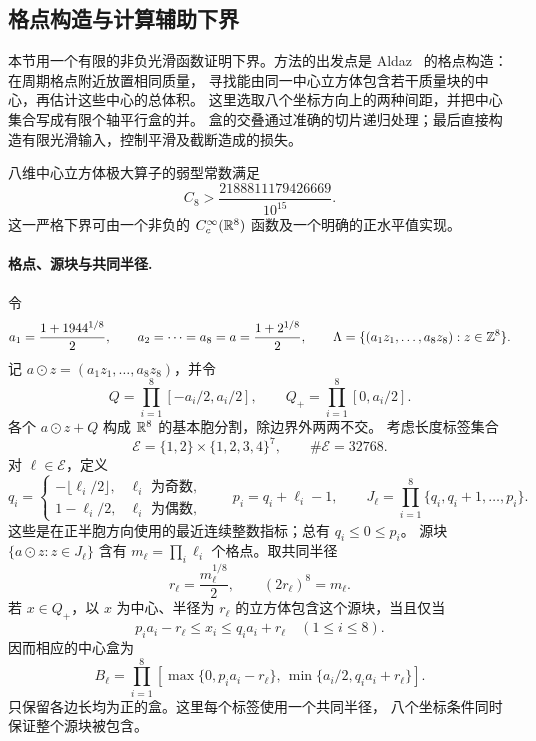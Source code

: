 \subsection{格点构造与计算辅助下界}
\label{lo:section}

本节用一个有限的非负光滑函数证明下界。方法的出发点是
Aldaz~\cite{Aldaz2000} 的格点构造：在周期格点附近放置相同质量，
寻找能由同一中心立方体包含若干质量块的中心，再估计这些中心的总体积。
这里选取八个坐标方向上的两种间距，并把中心集合写成有限个轴平行盒的并。
盒的交叠通过准确的切片递归处理；最后直接构造有限光滑输入，控制平滑及截断造成的损失。

\begin{proposition}\label{lo:bound}
八维中心立方体极大算子的弱型常数满足
\[
 C_8>\frac{2188811179426669}{10^{15}}.
\]
这一严格下界可由一个非负的 $C_c^\infty(\mathbb{R}^8)$ 函数及一个明确的正水平值实现。
\end{proposition}

\paragraph{格点、源块与共同半径.}
令
\begin{equation}\label{lo:spacing}
 a_1=\frac{1+1944^{1/8}}2,\qquad
 a_2=\cdots=a_8=a=\frac{1+2^{1/8}}2,
 \qquad
 \Lambda=\{(a_1z_1,\ldots,a_8z_8):z\in\mathbb{Z}^8\}.
\end{equation}
记 $a\odot z=(a_1z_1,\ldots,a_8z_8)$，并令
\[
 Q=\prod_{i=1}^8[-a_i/2,a_i/2],\qquad
 Q_+=\prod_{i=1}^8[0,a_i/2].
\]
各个 $a\odot z+Q$ 构成 $\mathbb{R}^8$ 的基本胞分割，除边界外两两不交。
考虑长度标签集合
\[
 \mathcal E=\{1,2\}\times\{1,2,3,4\}^7,
 \qquad \#\mathcal E=32768.
\]
对 $\ell\in\mathcal E$，定义
\begin{equation}\label{lo:source-indices}
 q_i=\begin{cases}
       -\lfloor\ell_i/2\rfloor,&\ell_i\text{ 为奇数},\\
       1-\ell_i/2,&\ell_i\text{ 为偶数},
      \end{cases}
 \qquad p_i=q_i+\ell_i-1,
 \qquad
 J_\ell=\prod_{i=1}^8\{q_i,q_i+1,\ldots,p_i\}.
\end{equation}
这些是在正半胞方向使用的最近连续整数指标；总有 $q_i\le0\le p_i$。
源块 $\{a\odot z:z\in J_\ell\}$ 含有
$m_\ell=\prod_i\ell_i$ 个格点。取共同半径
\begin{equation}\label{lo:common-radius}
 r_\ell=\frac{m_\ell^{1/8}}2,\qquad (2r_\ell)^8=m_\ell.
\end{equation}
若 $x\in Q_+$，以 $x$ 为中心、半径为 $r_\ell$ 的立方体包含这个源块，当且仅当
\[
 p_i a_i-r_\ell\le x_i\le q_i a_i+r_\ell
 \quad(1\le i\le8).
\]
因而相应的中心盒为
\begin{equation}\label{lo:true-box}
 B_\ell=\prod_{i=1}^8
 \left[\max\{0,p_i a_i-r_\ell\},\,
       \min\{a_i/2,q_i a_i+r_\ell\}\right].
\end{equation}
只保留各边长均为正的盒。这里每个标签使用一个共同半径，
八个坐标条件同时保证整个源块被包含。

